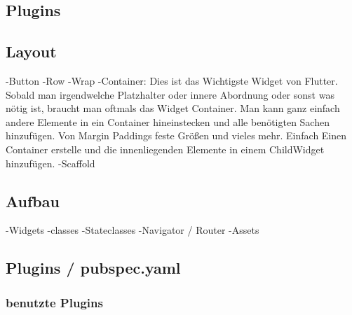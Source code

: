 \subsection{Plugins}

\subsection{Layout}
-Button
-Row
-Wrap
-Container: Dies ist das Wichtigste Widget von Flutter. Sobald man irgendwelche Platzhalter oder innere Abordnung oder sonst was nötig ist, braucht man oftmals das Widget Container. Man kann ganz einfach andere Elemente in ein Container hineinstecken und alle benötigten Sachen hinzufügen. Von Margin Paddings feste Größen und vieles mehr. Einfach Einen Container erstelle und die innenliegenden Elemente in einem ChildWidget hinzufügen.
-Scaffold
\subsection{Aufbau}
-Widgets
-classes
-Stateclasses
-Navigator / Router
-Assets

\subsection{Plugins / pubspec.yaml}
\subsubsection{benutzte Plugins}
